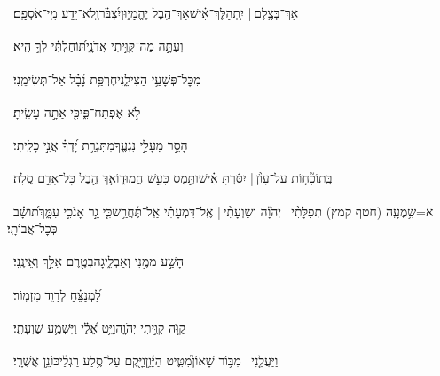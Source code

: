 \documentclass[12pt]{article}
\newcommand{\loc}[1]{\textsuperscript{\locf{#1}}}
\begin{document}
{\loc{ ז}~}‏אַךְ־בְּצֶ֤לֶם |  יִֽתְהַלֶּךְ־אִ֗ישׁ{\hfill}אַךְ־הֶ֥בֶל יֶהֱמָי֑וּן\newline\hspace*{.5em}יִ֝צְבֹּ֗ר{\hfill}וְֽלֹא־יֵדַ֥ע מִֽי־אֹסְפָֽם׃\par

{\loc{ ח}~}‏וְעַתָּ֣ה מַה־קִּוִּ֣יתִי אֲדֹנָ֑י{\hfill}תּ֝וֹחַלְתִּ֗י לְךָ֣ הִֽיא׃\par

{\loc{ ט}~}‏מִכׇּל־פְּשָׁעַ֥י הַצִּילֵ֑נִי{\hfill}חֶרְפַּ֥ת נָ֝בָ֗ל אַל־תְּשִׂימֵֽנִי׃\par

{\loc{ י}~}‏ לֹ֣א אֶפְתַּח־פִּ֑י{\hfill}כִּ֖י אַתָּ֣ה עָשִֽׂיתָ׃\par

{\loc{ יא}~}‏הָסֵ֣ר מֵעָלַ֣י נִגְעֶ֑ךָ{\hfill}מִתִּגְרַ֥ת יָ֝דְךָ֗ אֲנִ֣י כָלִֽיתִי׃\par

{\loc{ יב}~}‏בְּֽתוֹכָ֘ח֤וֹת עַל־עָוֺ֨ן | {\hfill}יִסַּ֬רְתָּ אִ֗ישׁ\newline\hspace*{.5em}וַתֶּ֣מֶס כָּעָ֣שׁ חֲמוּד֑וֹ{\hfill}אַ֤ךְ הֶ֖בֶל כׇּל־אָדָ֣ם סֶֽלָה׃\par

{\loc{ יג}~}‏א=שִׁ֥מֳעָֽה (חטף קמץ) תְפִלָּתִ֨י |  יְהֹוָ֡ה וְשַׁוְעָתִ֨י |  {\hfill}אֶֽל־דִּמְעָתִ֗י אַֽל־תֶּ֫חֱרַ֥שׁ\newline\hspace*{.5em}כִּ֤י גֵ֣ר אָנֹכִ֣י עִמָּ֑ךְ{\hfill}תּ֝וֹשָׁ֗ב כְּכׇל־אֲבוֹתָֽי׃\par

{\loc{ יד}~}‏הָשַׁ֣ע מִמֶּ֣נִּי וְאַבְלִ֑יגָה{\hfill}בְּטֶ֖רֶם אֵלֵ֣ךְ וְאֵינֶֽנִּי׃\par\pend
\ledpb
\pstart[\subsection*{\textcolor{red}{פרק מ}}]\label{פרק מ}
{\loc{ א}~}‏לַ֝מְנַצֵּ֗חַ לְדָוִ֥ד מִזְמֽוֹר׃\par

{\loc{ ב}~}‏קַוֺּ֣ה קִוִּ֣יתִי יְהֹוָ֑ה{\hfill}וַיֵּ֥ט אֵ֝לַ֗י וַיִּשְׁמַ֥ע שַׁוְעָתִֽי׃\par

{\loc{ ג}~}‏וַיַּעֲלֵ֤נִי |  מִבּ֥וֹר שָׁאוֹן֮{\hfill}מִטִּ֢יט הַיָּ֫וֵ֥ן\newline\hspace*{.5em}וַיָּ֖קֶם עַל־סֶ֥לַע רַגְלַ֗י{\hfill}כּוֹנֵ֥ן אֲשֻׁרָֽי׃\par
\end{document}
